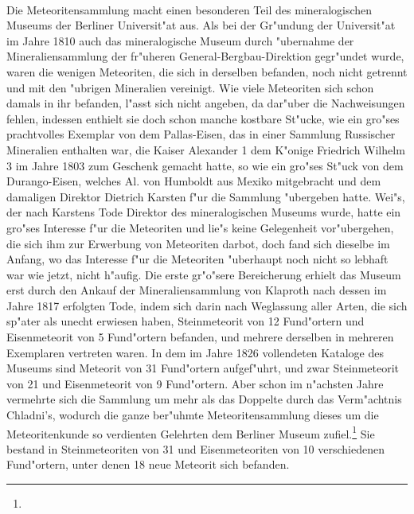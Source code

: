 \documentclass[a4paper, 11pt, oneside]{article}
\begin{document}
\paragraph{}
Die Meteoritensammlung macht einen besonderen Teil des mineralogischen Museums der Berliner Universit"at aus. Als bei der Gr"undung der Universit"at im Jahre 1810 auch das mineralogische Museum durch "ubernahme der Mineraliensammlung der fr"uheren General-Bergbau-Direktion gegr"undet wurde, waren die wenigen Meteoriten, die sich in derselben befanden, noch nicht getrennt und mit den "ubrigen Mineralien vereinigt. Wie viele Meteoriten sich schon damals in ihr befanden, l"asst sich nicht angeben, da dar"uber die Nachweisungen fehlen, indessen enthielt sie doch schon manche kostbare St"ucke, wie ein gro"ses prachtvolles Exemplar von dem Pallas-Eisen, das in einer Sammlung Russischer Mineralien enthalten war, die Kaiser Alexander 1 dem K"onige Friedrich Wilhelm 3 im Jahre 1803 zum Geschenk gemacht hatte, so wie ein gro"ses St"uck von dem Durango-Eisen, welches Al. von Humboldt aus Mexiko mitgebracht und dem damaligen Direktor Dietrich Karsten f"ur die Sammlung "ubergeben hatte. Wei"s, der nach Karstens Tode Direktor des mineralogischen Museums wurde, hatte ein gro"ses Interesse f"ur die Meteoriten und lie"s keine Gelegenheit vor"ubergehen, die sich ihm zur Erwerbung von Meteoriten darbot, doch fand sich dieselbe im Anfang, wo das Interesse f"ur die Meteoriten "uberhaupt noch nicht so lebhaft war wie jetzt, nicht h"aufig. Die erste gr"o"sere Bereicherung erhielt das Museum erst durch den Ankauf der Mineraliensammlung von Klaproth nach dessen im Jahre 1817 erfolgten Tode, indem sich darin nach Weglassung aller Arten, die sich sp"ater als unecht erwiesen haben, Steinmeteorit von 12 Fund"ortern und Eisenmeteorit von 5 Fund"ortern befanden, und mehrere derselben in mehreren Exemplaren vertreten waren. In dem im Jahre 1826 vollendeten Kataloge des Museums sind Meteorit von 31 Fund"ortern aufgef"uhrt, und zwar Steinmeteorit von 21 und Eisenmeteorit von 9 Fund"ortern. Aber schon im n"achsten Jahre vermehrte sich die Sammlung um mehr als das Doppelte durch das Verm"achtnis Chladni's, wodurch die ganze ber"uhmte Meteoritensammlung dieses um die Meteoritenkunde so verdienten Gelehrten dem Berliner Museum zufiel.\footnote{} Sie bestand in Steinmeteoriten von 31 und Eisenmeteoriten von 10 verschiedenen Fund"ortern, unter denen 18 neue Meteorit sich befanden.
\end{document}
